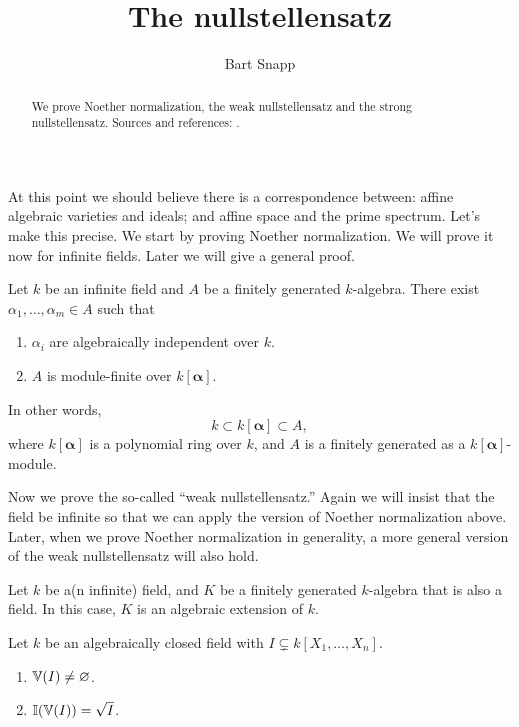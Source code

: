 \documentclass{ximera}
\author{Bart Snapp}
\title{The nullstellensatz}
\begin{document}
\begin{abstract}
  We prove Noether normalization, the weak nullstellensatz and the
  strong nullstellensatz. Sources and references:
  \cite{dE1995,hM1986,mR1995}.
\end{abstract}
\maketitle


At this point we should believe there is a correspondence between:
affine algebraic varieties and ideals; and affine space and the prime
spectrum. Let's make this precise. We start by proving Noether
normalization. We will prove it now for infinite fields. Later we will
give a general proof.

\begin{theorem}
  Let $k$ be an infinite field and $A$ be a finitely generated
  $k$-algebra. There exist $\alpha_1,\dots,\alpha_m\in A$ such that
  \begin{enumerate}
  \item $\alpha_i$ are algebraically independent over $k$.
  \item $A$ is module-finite over $k[\boldsymbol{\alpha}]$.
  \end{enumerate}
  In other words, 
  \[
  k\subset k[\boldsymbol{\alpha}] \subset A,
  \]
  where $k[\boldsymbol{\alpha}]$ is a polynomial ring over $k$, and
  $A$ is a finitely generated as a $k[\boldsymbol{\alpha}]$-module.
\end{theorem}


Now we prove the so-called ``weak nullstellensatz.'' Again we will
insist that the field be infinite so that we can apply the version of
Noether normalization above. Later, when we prove Noether
normalization in generality, a more general version of the weak
nullstellensatz will also hold.

\begin{theorem}
  Let $k$ be a(n infinite) field, and $K$ be a finitely generated
  $k$-algebra that is also a field. In this case, $K$ is an algebraic
  extension of $k$.
  \end{theorem}




\begin{theorem}[Nullstellensatz]
  Let $k$ be an algebraically closed field with $I \subsetneq k[X_1,\dots,X_n]$.
  \begin{enumerate}
  \item $\mathbb V(I) \ne \varnothing$.
  \item $\mathbb I(\mathbb V(I)) = \sqrt{I}$.
  \end{enumerate}
\end{theorem}
\end{document}
